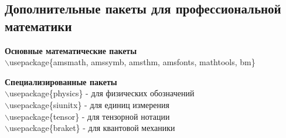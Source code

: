 \documentclass[a4paper, 14pt]{extarticle}
\newcommand{\n}{\par}
\begin{document}
	\subsection*{Дополнительные пакеты для профессиональной математики}
	\textbf{Основные математические пакеты}\\
	$\backslash$usepackage\{amsmath, amssymb, amsthm, amsfonts, mathtools, bm\}\n
	\textbf{Специализированные пакеты}\\
	$\backslash$usepackage\{physics\} - для физических обозначений\\
	$\backslash$usepackage\{siunitx\} -  для единиц измерения\\
	$\backslash$usepackage\{tensor\} - для тензорной нотации\\
	$\backslash$usepackage\{braket\} - для квантовой механики

	
\end{document}

